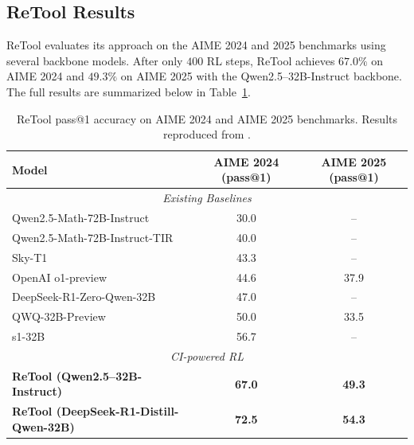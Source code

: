 \documentclass{article}
\begin{document}
\subsection{ReTool Results}
ReTool evaluates its approach on the AIME 2024 and 2025 benchmarks using several 
backbone models. After only $400$ RL steps, ReTool achieves $67.0\%$ on AIME 2024 
and $49.3\%$ on AIME 2025 with the Qwen2.5--32B-Instruct backbone.
The full results are summarized below in Table~\ref{tab:retool_full_pass1}.


\begin{table}[H]
\centering
\caption{ReTool pass@1 accuracy on AIME 2024 and AIME 2025 benchmarks. 
Results reproduced from \citet{feng2025retoolreinforcementlearningstrategic}.}
\label{tab:retool_full_pass1}
\begin{tabular}{lcc}
\toprule
\textbf{Model} & \textbf{AIME 2024 (pass@1)} & \textbf{AIME 2025 (pass@1)} \\
\midrule
\multicolumn{3}{c}{\textit{Existing Baselines}} \\
\midrule
Qwen2.5-Math-72B-Instruct       & 30.0 & --   \\
Qwen2.5-Math-72B-Instruct-TIR   & 40.0 & --   \\
Sky-T1                          & 43.3 & --   \\
OpenAI o1-preview               & 44.6 & 37.9 \\
DeepSeek-R1-Zero-Qwen-32B       & 47.0 & --   \\
QWQ-32B-Preview                 & 50.0 & 33.5 \\
s1-32B                          & 56.7 & --   \\
\midrule
\multicolumn{3}{c}{\textit{CI-powered RL}} \\
\midrule
\textbf{ReTool (Qwen2.5--32B-Instruct)}                & \textbf{67.0} & \textbf{49.3} \\
\textbf{ReTool (DeepSeek-R1-Distill-Qwen-32B)}        & \textbf{72.5} & \textbf{54.3} \\
\bottomrule
\end{tabular}
\end{table}
\end{document}
